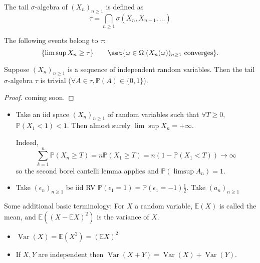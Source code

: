 \documentclass{article}
\newcommand{\1}[1]{\mathbbm{1}_{#1}}
\newcommand{\Prob}{\mathbb{P}}
\DeclareMathOperator{\Var}{Var}
\begin{document}
\begin{defi}
    The tail $\sigma$-algebra of $(X_n)_{n \geq 1}$ is defined as
    \begin{equation*}
        \tau = \bigcap_{n \geq 1} \sigma(X_n, X_{n+1}, \dotsc)
    \end{equation*}
\end{defi}

\begin{eg}
    The following events belong to $\tau$:
    \begin{equation*}
        \{\lim \sup X_n \geq \tau\} \qquad \set{\omega \in \Omega | (X_n(\omega))_{n \geq 1} \text{ converges}}.
    \end{equation*}
\end{eg}

\begin{thm}
    Suppose $(X_n)_{n \geq 1}$ is a sequence of independent random variables. Then the tail $\sigma$-algebra $\tau$ is trivial ($\forall A \in \tau, \Prob(A) \in \{0, 1\}$).
\end{thm}

\begin{proof}
    coming soon.
\end{proof}

\begin{eg}
    \begin{itemize}
        \item Take an iid space $(X_n)_{n \geq 1}$ of random variables such that $\forall T \geq 0$, $\Prob(X_1 < 1) < 1$.
            Then almost surely $\lim \sup X_n = +\infty$.

            Indeed,
            \begin{equation*}
                \sum_{k=1}^n \Prob(X_n \geq T) = n \Prob(X_1 \geq T) = n(1 - \Prob(X_1 < T)) \to \infty
            \end{equation*}
            so the second borel cantelli lemma applies and $\Prob(\limsup A_n) = 1$.
        \item Take $(\epsilon_n)_{n \geq 1}$ be iid RV $\Prob(\epsilon_1 = 1) = \Prob(\epsilon_1 = -1) \frac{1}{2}$.
            Take $(a_n)_{n \geq 1}$
    \end{itemize}
\end{eg}

Some additional basic terminology:
For $X$ a random variable, $\mathbb{E}(X)$ is called the mean, and $\mathbb{E}((X - \mathbb{E}X)^2)$ is the variance of $X$.

\begin{remark}
    \leavevmode
    \begin{itemize}
        \item $\Var(X) = \mathbb{E}(X^2) = (\mathbb{E}X)^2$
        \item If $X, Y$ are independent then $\Var(X + Y) = \Var(X) + \Var(Y)$.
    \end{itemize}
\end{remark}
\end{document}
